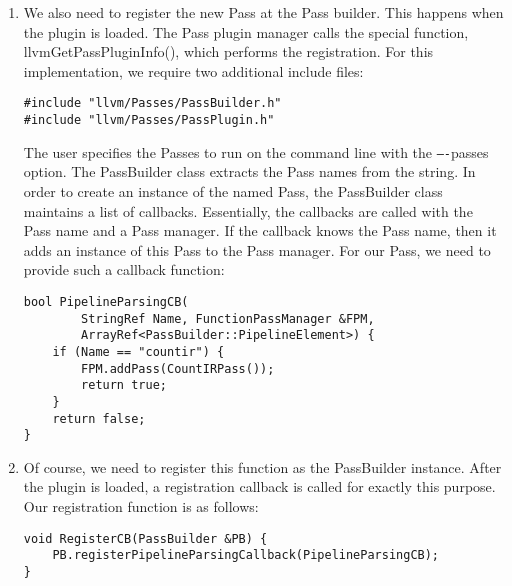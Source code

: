 \begin{enumerate}
\item We also need to register the new Pass at the Pass builder. This happens when the plugin is loaded. The Pass plugin manager calls the special function, llvmGetPassPluginInfo(), which performs the registration. For this implementation, we require two additional include files:
\begin{lstlisting}[caption={}]
#include "llvm/Passes/PassBuilder.h"
#include "llvm/Passes/PassPlugin.h"
\end{lstlisting}
The user specifies the Passes to run on the command line with the \verb|–-|passes option. The PassBuilder class extracts the Pass names from the string. In order to create an instance of the named Pass, the PassBuilder class maintains a list of callbacks. Essentially, the callbacks are called with the Pass name and a Pass manager. If the callback knows the Pass name, then it adds an instance of this Pass to the Pass manager. For our Pass, we need to provide such a callback function:
\begin{lstlisting}[caption={}]
bool PipelineParsingCB(
		StringRef Name, FunctionPassManager &FPM,
		ArrayRef<PassBuilder::PipelineElement>) {
	if (Name == "countir") {
		FPM.addPass(CountIRPass());
		return true;
	}
	return false;
}
\end{lstlisting}

\item Of course, we need to register this function as the PassBuilder instance. After the plugin is loaded, a registration callback is called for exactly this purpose. Our registration function is as follows:
\begin{lstlisting}[caption={}]
void RegisterCB(PassBuilder &PB) {
	PB.registerPipelineParsingCallback(PipelineParsingCB);
}
\end{lstlisting}


\end{enumerate}
